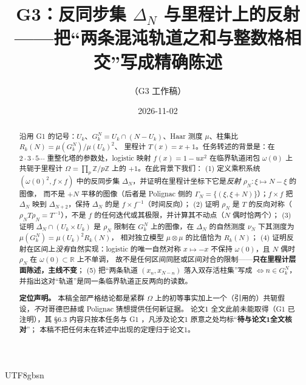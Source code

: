 \documentclass[11pt,a4paper]{article}
\newcommand{\Haar}{\mu}
\newcommand{\Om}{\Omega}               %
\theoremstyle{plain}
\theoremstyle{definition}
\begin{document}
\begin{CJK}{UTF8}{gbsn}

\title{G3：反同步集 $\Delta_N$ 与里程计上的反射\\[2pt]
\large ——{}把“两条混沌轨道之和与整数格相交”写成精确陈述}
\author{（G3 工作稿）}
\date{2026-11-02}
\maketitle

\begin{abstract}
沿用 G1 \cite{G1} 的记号：$U_k$、$G_k^N=U_k\cap(N-U_k)$、Haar 测度 $\Haar$、柱集比 $R_k(N)=\Haar(G_k^N)/\Haar(U_k)^2$、
里程计 $T(x)=x+1$。任务转述的背景是：在 $2\cdot3\cdot5\cdots$ 重整化塔的参数处，logistic 映射 $f(x)=1-ux^2$ 在临界轨道闭包
$\omega(0)$ 上共轭于里程计 $\Om=\prod_p\mathbb Z/p\mathbb Z$ 上的 $+1$。在此背景下我们：
(1) 定义乘积系统 $(\omega(0)^2,f\times f)$ 中的反同步集 $\Delta_N$，并证明在里程计坐标下它是\emph{反射} $\rho_N:\xi\mapsto N-\xi$ 的图像，
而不是 $+N$ 平移的图像（后者是 Polignac 侧的 $\Gamma_N=\{(\xi,\xi+N)\}$）；$f\times f$ 把 $\Delta_N$ 映到 $\Delta_{N+2}$，保持 $\Delta_N$ 的是
$f\times f^{-1}$（时间反向）；
(2) 证明 $\rho_N$ 是 $T$ 的反向对称（$\rho_NT\rho_N=T^{-1}$），不是 $f$ 的任何迭代或其极限，并计算其不动点（$N$ 偶时恰两个）；
(3) 证明 $\Delta_N\cap(U_k\times U_k)$ 是 $\rho_N$ 限制在 $G_k^N$ 上的图像，在 $\Delta_N$ 的自然测度 $\nu_N$ 下其测度为 $\Haar(G_k^N)=\Haar(U_k)^2R_k(N)$，
相对独立模型 $\Haar\otimes\Haar$ 的比值恰为 $R_k(N)$；
(4) 证明反射在区间上\emph{没有}自然实现：logistic 的唯一自然对称 $x\mapsto-x$ 不保持 $\omega(0)$，且 $N$ 偶时 $\rho_N$ 在 $\omega(0)\subset\mathbb R$ 上不单调，
故不是任何区间同胚或区间对合的限制——\textbf{只在里程计层面陈述，主线不变}；
(5) 把“两条轨道 $(x_n,x_{N-n})$ 落入双存活柱集”写成 $\iff n\in G_k^N$，并指出这对“轨道”是同一条临界轨道正反两向的读数。

\textbf{定位声明。} 本稿全部严格结论都是紧群 $\Om$ 上的初等事实加上一个（引用的）共轭假设，\emph{不}对哥德巴赫或 Polignac 猜想提供任何新证据。
论文1 \cite{Wang26} 全文此前未能取得（G1 已注明），其 \S6.3 内容只按本任务与 G1 ，凡涉及论文1 原意之处均标“\textbf{待与论文1全文核对}”；
本稿不把任何未在转述中出现的定理归于论文1。
\end{abstract}


\end{CJK}
\end{document}
